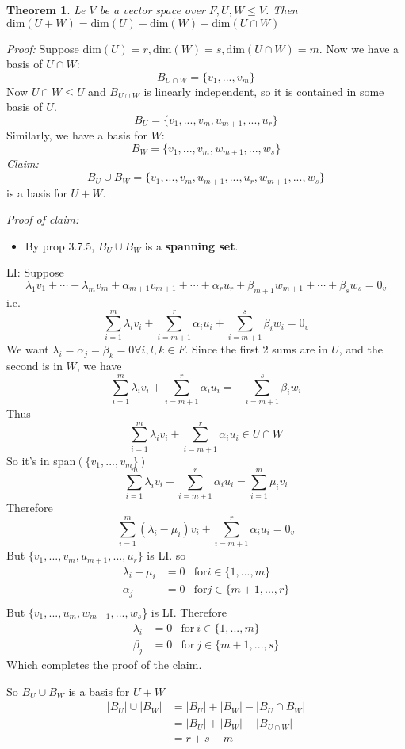 \documentclass{report}
\newtheorem{theorem}{Theorem}[subsection]
\theoremstyle{remark}
\theoremstyle{definition}
\theoremstyle{definition}
\theoremstyle{theorem}
\begin{document}
\begin{theorem}
Le $V$ be a vector space over $F, U,W \leq V$. Then $\mathrm{dim}(U+W) = \mathrm{dim}(U) + \mathrm{dim}(W) -\mathrm{dim}(U\cap W)$
\end{theorem}
\emph{Proof:} Suppose dim$(U) = r, \mathrm{dim}(W) = s, \mathrm{dim}(U\cap W) = m$. Now we have a basis of $U \cap W$:
\[B_{U \cap W} = \{v_1, ..., v_m \} \]
Now $U \cap W \leq U$ and $B_{U \cap W}$ is linearly independent, so it is contained in some basis of $U$.
\[B_U = \{v_1, ..., v_m, u_{m+1}, ..., u_r \}\]
Similarly, we have a basis for $W$:
\[ B_W = \{v_1, ..., v_m, w_{m+1}, ..., w_s\}\]
\emph{Claim:} 
\[B_U \cup B_W = \{v_1, ..., v_m, u_{m+1}, ..., u_r, w_{m+1}, ..., w_s \} \]
is a basis for $U+W$.\par
\emph{Proof of claim:} 
\begin{itemize}
    \item By prop 3.7.5, $B_U \cup B_W$ is a \textbf{spanning set}.
\end{itemize}
LI: Suppose
\[\lambda_1v_1 + \cdots + \lambda_mv_m + \alpha_{m+1}v_{m+1} + \cdots + \alpha_ru_r + \beta_{m+1}w_{m+1} + \cdots + \beta_sw_s = 0_v\]
i.e.
\[\sum^m_{i = 1}\lambda_iv_i + \sum^r_{i=m+1}\alpha_iu_i + \sum^s_{i=m+1}\beta_iw_i = 0_v\]
We want $\lambda_i = \alpha_j = \beta_k = 0 \forall i,l,k \in F$. Since the first 2 sums are in $U$, and the second is in $W$, we have
\[\sum^m_{i=1}\lambda_iv_i + \sum^r_{i=m+1} \alpha_iu_i = -\sum^s_{i=m+1}\beta_iw_i\]
Thus
\[\sum^m_{i=1}\lambda_iv_i + \sum^r_{i=m+1} \alpha_iu_i \in U \cap W\]
So it's in span$(\{v_1, ..., v_m\})$
\[\sum^m_{i=1}\lambda_iv_i + \sum^r_{i=m+1}\alpha_iu_i = \sum^m_{i=1} \mu_iv_i\]
Therefore
\[\sum^m_{i=1}(\lambda_i - \mu_i)v_i + \sum^r_{i=m+1}\alpha_iu_i = 0_v\]
But $\{v_1, ..., v_m, u_{m+1}, ..., u_r \}$ is LI.
so
\begin{align*}
    \lambda_i - \mu_i &= 0 & \text{for} i \in \{1, ..., m\}\\
    \alpha_j &= 0 & \text{for} j \in \{m+1, ..., r\}\\
\end{align*}
But $\{ v_1, ..., u_m, w_{m+1}, ..., w_s$\} is LI. Therefore
\begin{align*}
    \lambda_i &= 0 & \text{for} \> i \in \{1, ..., m\}\\
    \beta_j &= 0 & \text{for} \> j \in \{m+1, ..., s\}
\end{align*}
Which completes the proof of the claim.\par
So $B_U \cup B_W$ is a basis for $U+W$
\begin{align*}
    |B_U| \cup |B_W| &= |B_U| + |B_W| - |B_U \cap B_W|\\
    &= |B_U|+|B_W|-|B_{U\cap W}|\\
    &= r+s-m
\end{align*}
\qedsymbol
\end{document}
